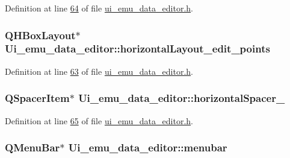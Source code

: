 Definition at line \hyperlink{a00051_source_l00064}{64} of file \hyperlink{a00051_source}{ui\+\_\+emu\+\_\+data\+\_\+editor.\+h}.

\hypertarget{a00026_ae08b661288ecee049945e4a63d0c0af0}{
\subsubsection[{horizontal\+Layout\+\_\+edit\+\_\+points}]{\setlength{\rightskip}{0pt plus 5cm}Q\+H\+Box\+Layout$\ast$ Ui\+\_\+emu\+\_\+data\+\_\+editor\+::horizontal\+Layout\+\_\+edit\+\_\+points}}\label{a00026_ae08b661288ecee049945e4a63d0c0af0}


Definition at line \hyperlink{a00051_source_l00063}{63} of file \hyperlink{a00051_source}{ui\+\_\+emu\+\_\+data\+\_\+editor.\+h}.

\hypertarget{a00026_a025c1b6f38c90cfa55572934535451a2}{
\subsubsection[{horizontal\+Spacer\+\_\+2}]{\setlength{\rightskip}{0pt plus 5cm}Q\+Spacer\+Item$\ast$ Ui\+\_\+emu\+\_\+data\+\_\+editor\+::horizontal\+Spacer\+\_}}\label{a00026_a025c1b6f38c90cfa55572934535451a2}


Definition at line \hyperlink{a00051_source_l00065}{65} of file \hyperlink{a00051_source}{ui\+\_\+emu\+\_\+data\+\_\+editor.\+h}.

\hypertarget{a00026_af09fe2fe1f34525f5caeb5ada7d297bf}{
\subsubsection[{menubar}]{\setlength{\rightskip}{0pt plus 5cm}Q\+Menu\+Bar$\ast$ Ui\+\_\+emu\+\_\+data\+\_\+editor\+::menubar}}\label{a00026_af09fe2fe1f34525f5caeb5ada7d297bf}


